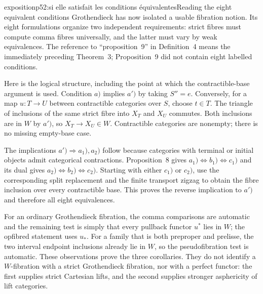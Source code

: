 \begin{dcomment}{exposition}{p52:si elle satisfait les conditions équivalentes}{Reading the eight equivalent conditions}
Grothendieck has now isolated a usable fibration notion. Its eight formulations organize two independent requirements: strict fibres must compute comma fibres universally, and the latter must vary by weak equivalences. The reference to ``proposition~9'' in Definition~4 means the immediately preceding Theorem~3; Proposition~9 did not contain eight labelled conditions.

Here is the logical structure, including the point at which the contractible-base argument is used. Condition $a)$ implies $a')$ by taking $S''=e$. Conversely, for a map $u:T\to U$ between contractible categories over $S$, choose $t\in T$. The triangle of inclusions of the same strict fibre into $X_T$ and $X_U$ commutes. Both inclusions are in $W$ by $a')$, so $X_T\to X_U\in W$. Contractible categories are nonempty; there is no missing empty-base case.

The implications $a')\Rightarrow a_1),a_2)$ follow because categories with terminal or initial objects admit categorical contractions. Proposition~8 gives $a_1)\Longleftrightarrow b_1)\Longleftrightarrow c_1)$ and its dual gives $a_2)\Longleftrightarrow b_2)\Longleftrightarrow c_2)$. Starting with either $c_1)$ or $c_2)$, use the corresponding split replacement and the finite transport zigzag to obtain the fibre inclusion over every contractible base. This proves the reverse implication to $a')$ and therefore all eight equivalences.

For an ordinary Grothendieck fibration, the comma comparisons are automatic and the remaining test is simply that every pullback functor $u^*$ lies in $W$; the opfibred statement uses $u_*$. For a family that is both preproper and prelisse, the two interval endpoint inclusions already lie in $W$, so the pseudofibration test is automatic. These observations prove the three corollaries. They do not identify a $W$-fibration with a strict Grothendieck fibration, nor with a perfect functor: the first supplies strict Cartesian lifts, and the second supplies stronger asphericity of lift categories.
\end{dcomment}

